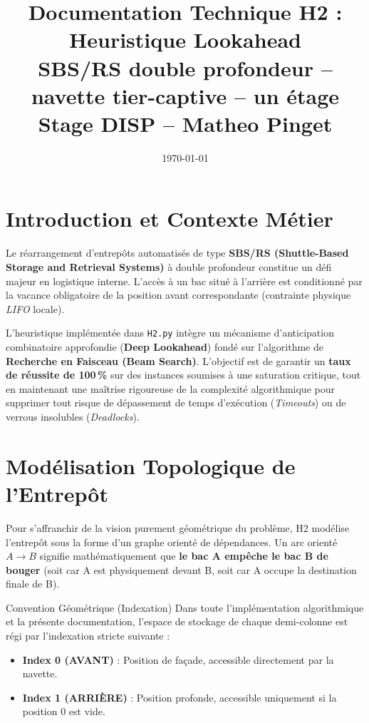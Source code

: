 \documentclass[11pt,a4paper]{article}
\title{
  \textbf{\color{bleuDIBP}Documentation Technique H2 : Heuristique Lookahead}\\[0.4em]
  \large SBS/RS double profondeur -- navette tier-captive -- un étage\\[0.2em]
  \normalsize Stage DISP -- Matheo Pinget
}
\date{\today}
\author{}
\begin{document}
\maketitle
\tableofcontents
\newpage

\section{Introduction et Contexte Métier}

Le réarrangement d'entrepôts automatisés de type \textbf{SBS/RS (Shuttle-Based Storage and Retrieval Systems)} à double profondeur constitue un défi majeur en logistique interne. L'accès à un bac situé à l'arrière est conditionné par la vacance obligatoire de la position avant correspondante (contrainte physique \emph{LIFO} locale). 

L'heuristique implémentée dans \texttt{H2.py} intègre un mécanisme d'anticipation combinatoire approfondie (\textbf{Deep Lookahead}) fondé sur l'algorithme de \textbf{Recherche en Faisceau (Beam Search)}. L'objectif est de garantir un \textbf{taux de réussite de 100\,\%} sur des instances soumises à une saturation critique, tout en maintenant une maîtrise rigoureuse de la complexité algorithmique pour supprimer tout risque de dépassement de temps d'exécution (\emph{Timeouts}) ou de verrous insolubles (\emph{Deadlocks}).

\section{Modélisation Topologique de l'Entrepôt}
Pour s'affranchir de la vision purement géométrique du problème, H2 modélise l'entrepôt sous la forme d'un graphe orienté de dépendances. Un arc orienté $A \rightarrow B$ signifie mathématiquement que \textbf{le bac A empêche le bac B de bouger} (soit car A est physiquement devant B, soit car A occupe la destination finale de B).

\begin{mydef}{Convention Géométrique (Indexation)}
Dans toute l'implémentation algorithmique et la présente documentation, l'espace de stockage de chaque demi-colonne est régi par l'indexation stricte suivante :
\begin{itemize}[noitemsep]
    \item \textbf{Index 0 (AVANT)} : Position de façade, accessible directement par la navette.
    \item \textbf{Index 1 (ARRIÈRE)} : Position profonde, accessible uniquement si la position 0 est vide.
\end{itemize}
\end{mydef}
\end{document}
